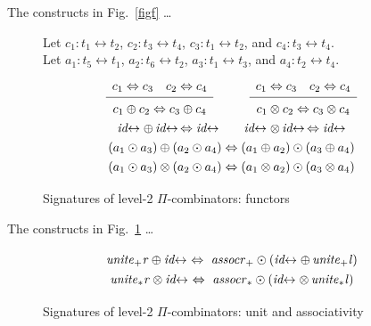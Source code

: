 \documentclass{article}
\newcommand{\identlp}{\mathit{unite}_+\mathit{l}}
\newcommand{\identlsp}{\mathit{unite}_+\mathit{r}}
\newcommand{\assocrp}{\mathit{assocr}_+}
\newcommand{\identlt}{\mathit{unite}_*\mathit{l}}
\newcommand{\identlst}{\mathit{unite}_*\mathit{r}}
\newcommand{\assocrt}{\mathit{assocr}_*}
\newcommand{\idc}{\mathit{id}\!\!\leftrightarrow}
\newcommand{\Rule}[4]{
\makebox{{\rm #1}
$\displaystyle
\frac{\begin{array}{l}#2 \\\end{array}}
{\begin{array}{l}#3      \\\end{array}}$
 #4}}
\begin{document}
The constructs in Fig.~\ref{figf} \ldots 
\begin{center}
\begin{tikzpicture}[scale=0.7,every node/.style={scale=0.8}]
\end{tikzpicture}
\end{center}

\begin{figure}[tb]
Let $c_1 : t_1 \leftrightarrow t_2$, $c_2 : t_3 \leftrightarrow t_4$, $c_3 : t_1 \leftrightarrow t_2$, and $c_4 : t_3 \leftrightarrow t_4$. \\
Let $a_1 : t_5 \leftrightarrow t_1$,  $a_2 : t_6 \leftrightarrow t_2$, $a_3 : t_1 \leftrightarrow t_3$, and $a_4 : t_2 \leftrightarrow t_4$.
\[\def\arraystretch{1.3}
\begin{array}{c}
\Rule{}
  {c_1 \Leftrightarrow c_3 \quad c_2 \Leftrightarrow c_4}
  {c_1 \oplus c_2 \Leftrightarrow c_3 \oplus c_4}
  {}
\qquad
\Rule{}
  {c_1 \Leftrightarrow c_3 \quad c_2 \Leftrightarrow c_4}
  {c_1 \otimes c_2 \Leftrightarrow c_3 \otimes c_4}
  {}
\\
  {\idc \oplus \, \idc \, \Leftrightarrow \idc}
\qquad
  {\idc \otimes \, \idc \, \Leftrightarrow \idc}
\\
  {(a_1 \odot a_3) \oplus (a_2 \odot a_4) \Leftrightarrow (a_1 \oplus a_2) \odot (a_3 \oplus a_4)}
\\
  {(a_1 \odot a_3) \otimes (a_2 \odot a_4) \Leftrightarrow (a_1 \otimes a_2) \odot (a_3 \otimes a_4)}
\end{array}\]
\caption{\label{fige}Signatures of level-2 $\Pi$-combinators: functors}
\end{figure}

The constructs in Fig.~\ref{fige} \ldots 
\begin{center}
\begin{tikzpicture}[scale=0.7,every node/.style={scale=0.8}]
\end{tikzpicture}
\end{center}

\begin{figure}[tb]
\[\def\arraystretch{1.3}
\begin{array}{c}
  {\identlsp \oplus \idc ~\Leftrightarrow~ \assocrp \odot (\idc \oplus \, \identlp)}
\\
  {\identlst \otimes \idc ~\Leftrightarrow~ \assocrt \odot (\idc \otimes \, \identlt)}
\end{array}\]
\caption{\label{figd}Signatures of level-2 $\Pi$-combinators: unit and associativity}
\end{figure}
\end{document}

